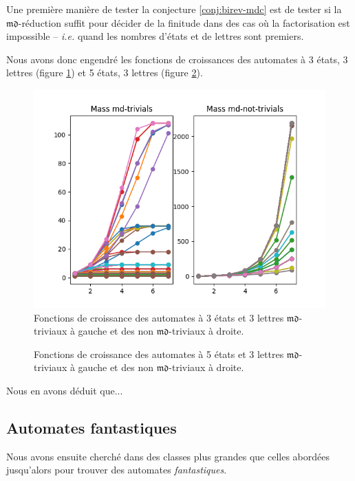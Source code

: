 \documentclass[11pt,a4paper]{article}
\begin{document}
Une première manière de tester la conjecture \ref{conj:birev-mdc} est de tester si la $\mathfrak{md}$-réduction suffit pour décider de la finitude dans des cas où la factorisation est impossible -- \emph{i.e.} quand les nombres d'états et de lettres sont premiers.

Nous avons donc engendré les fonctions de croissances des automates à 3 états, 3 lettres (figure \ref{fig:mass-33}) et 5 états, 3 lettres (figure \ref{fig:mass-53}).

\begin{figure}[h]
  \centering
  \includegraphics[width=\textwidth]{mass_33.png}
  \caption{Fonctions de croissance des automates à 3 états et 3 lettres $\mathfrak{md}$-triviaux à gauche et des non $\mathfrak{md}$-triviaux à droite.\label{fig:mass-33}}
\end{figure}

\begin{figure}[h]
  \centering
  \caption{Fonctions de croissance des automates à 5 états et 3 lettres $\mathfrak{md}$-triviaux à gauche et des non $\mathfrak{md}$-triviaux à droite.\label{fig:mass-53}}
\end{figure}

Nous en avons déduit que...

\subsection{Automates fantastiques}

Nous avons ensuite cherché dans des classes plus grandes que celles abordées jusqu'alors pour trouver des automates \textit{fantastiques}.
\end{document}
